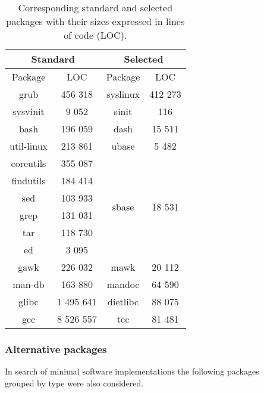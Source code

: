 \begin{table}[!h]
    \centering
    \begin{tabular}{|c|c||c|c|}
        \hline
        \multicolumn{2}{|c||}{Standard} & \multicolumn{2}{|c|}{Selected} \\
        \hline
        \hline
        Package & LOC & Package & LOC \\
        \hline
        \hline
        grub \cite{grub} & 456 318 & syslinux \cite{syslinux} & 412 273 \\
        \hline
        sysvinit \cite{sysvinit} & 9 052 & sinit \cite{sinit} & 116 \\
        \hline
        bash \cite{bash} & 196 059 & dash \cite{dash} & 15 511 \\
        \hline
        util-linux \cite{util-linux} & 213 861 & ubase \cite{ubase} & 5 482 \\
        \hline
        coreutils \cite{coreutils} & 355 087 & \multirow{6}{*}{sbase \cite{sbase}} & \multirow{6}{*}{18 531} \\
        findutils \cite{findutils} & 184 414 & & \\
        sed \cite{sed} & 103 933 & & \\
        grep \cite{grep} & 131 031 & & \\
        tar \cite{tar} & 118 730 & & \\
        ed \cite{ed} & 3 095 & & \\
        \hline
        gawk \cite{gawk} & 226 032 & mawk \cite{mawk} & 20 112 \\
        \hline
        man-db \cite{man-db} & 163 880 & mandoc \cite{mandoc} & 64 590 \\
        \hline
        glibc \cite{glibc} & 1 495 641 & dietlibc \cite{dietlibc} & 88 075 \\
        \hline
        gcc \cite{gcc} & 8 526 557 & tcc \cite{tcc} & 81 481 \\
        \hline
    \end{tabular}
    \caption{Corresponding standard and selected packages with their sizes expressed in lines of code (LOC).}
\end{table}

\newpage

\subsubsection{Alternative packages}

In search of minimal software implementations the following packages\\ grouped by type were also considered.

